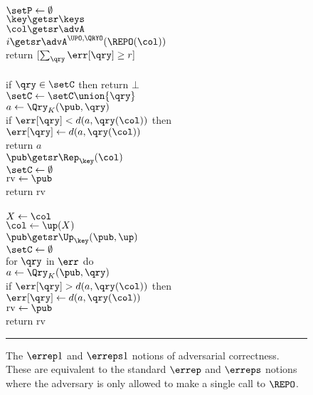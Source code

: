 \begin{figure}[t]
  {
     \\[2pt]
      $\setP \gets \emptyset$\\
      $\key \getsr \keys$\\
      $\col \getsr \advA$\\
      $i \getsr \advA^{\UPO,\QRYO}(\REPO(\col))$\\
      return $[\sum_\qry \err[\qry] \geq r]$ 
    \\[6pt]

    \oraclev{$\QRYO(\qry)$}\\[2pt]
      if $\qry \in \setC$ then return $\bot$\\
      $\setC \gets \setC \union \{\qry\}$\\
      $a \gets \Qry_K(\pub, \qry)$\\
      if $\err[\qry] < d(a,\qry(\col))$ then\\
      \tab$\err[\qry] \gets d(a,\qry(\col))$\\
      return $a$
  }
  {
    \oraclev{$\REPO(\col)$}\\[2pt]
      $\pub \getsr \Rep_\key(\col)$\\
      $\setC \gets \emptyset$\\
      $\mathrm{rv} \gets \pub$  \\
      return $\mathrm{rv}$
    \\[6pt]
    \oraclev{$\UPO(\up)$}\\[2pt]
      $X \gets \col$ \\
      $\col \gets \up(X)$\\
      $\pub \getsr \Up_\key(\pub, \up)$\\
      $\setC \gets \emptyset$\\
      for $\qry$ in $\err$ do\\
      \tab $a \gets \Qry_K(\pub, \qry)$\\
      \tab if $\err[\qry] > d(a,\qry(\col))$ then\\
      \tab\tab$\err[\qry] \gets d(a,\qry(\col))$\\
      $\mathrm{rv} \gets \pub$ \\
      return $\mathrm{rv}$
  }
  \caption{The $\errep1$ and $\erreps1$ notions of adversarial correctness. These are equivalent to the standard $\errep$ and $\erreps$ notions where the adversary is only allowed to make a single call to $\REPO$.}
  \vspace{6pt}\hrule
  \label{fig:security}
\end{figure}